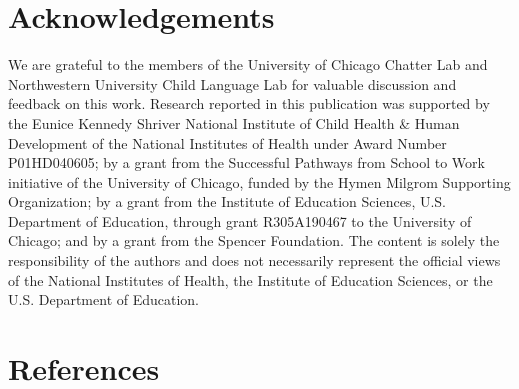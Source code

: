 \documentclass[10pt, letterpaper]{article}
\begin{document}
\vspace{1em}

\hypertarget{acknowledgements}{%
\section{Acknowledgements}\label{acknowledgements}}

We are grateful to the members of the University of Chicago Chatter Lab
and Northwestern University Child Language Lab for valuable discussion
and feedback on this work. Research reported in this publication was
supported by the Eunice Kennedy Shriver National Institute of Child
Health \& Human Development of the National Institutes of Health under
Award Number P01HD040605; by a grant from the Successful Pathways from
School to Work initiative of the University of Chicago, funded by the
Hymen Milgrom Supporting Organization; by a grant from the Institute of
Education Sciences, U.S. Department of Education, through grant
R305A190467 to the University of Chicago; and by a grant from the
Spencer Foundation. The content is solely the responsibility of the
authors and does not necessarily represent the official views of the
National Institutes of Health, the Institute of Education Sciences, or
the U.S. Department of Education.

\hypertarget{references}{%
\section{References}\label{references}}

\setlength{\parindent}{-0.1in} 
\setlength{\leftskip}{0.125in}

\noindent
\end{document}
